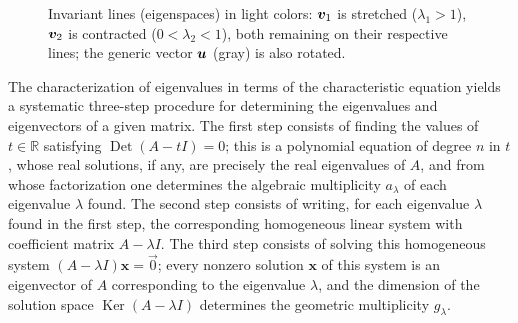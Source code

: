 \begin{figure}[!htbp]
\centering
{}
\caption[Eigenvectors: invariant directions]{Invariant lines (eigenspaces) in light colors:
  $\bm{v}_1$ is stretched ($\lambda_1>1$), $\bm{v}_2$ is contracted ($0<\lambda_2<1$), both remaining
  on their respective lines; the generic vector $\bm{u}$ (gray) is also rotated.}
\label{fig:ch8-eigenvectors}
\end{figure}

The characterization of eigenvalues in terms of the characteristic equation yields a systematic three-step procedure for determining the eigenvalues and eigenvectors of a given matrix. The first step consists of finding the values of $t \in \mathbb{R}$ satisfying $\operatorname{Det}(A - tI) = 0$; this is a polynomial equation of degree $n$ in $t$, whose real solutions, if any, are precisely the real eigenvalues of $A$, and from whose factorization one determines the algebraic multiplicity $a_\lambda$ of each eigenvalue $\lambda$ found. The second step consists of writing, for each eigenvalue $\lambda$ found in the first step, the corresponding homogeneous linear system with coefficient matrix $A - \lambda I$. The third step consists of solving this homogeneous system $(A - \lambda I)\mathbf{x} = \vec{0}$; every nonzero solution $\mathbf{x}$ of this system is an eigenvector of $A$ corresponding to the eigenvalue $\lambda$, and the dimension of the solution space $\operatorname{Ker}(A - \lambda I)$ determines the geometric multiplicity $g_\lambda$.

